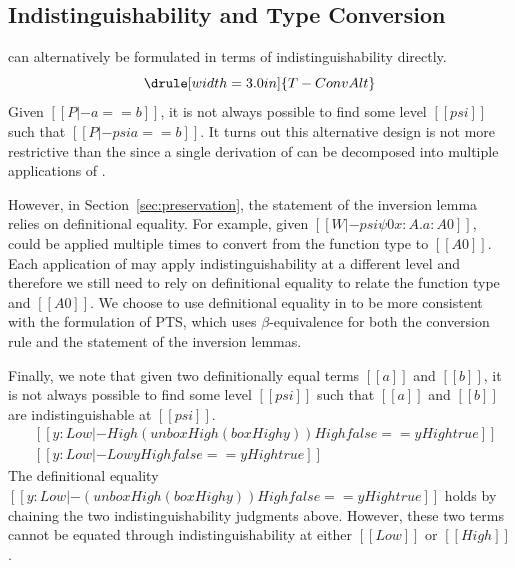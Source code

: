 \documentclass[acmsmall]{acmart}
\newcommand{\scw}[1]{}
\newcommand{\yl}[1]{}
\begin{document}
\ifextended
\subsection{Indistinguishability and Type Conversion}
\scw{Because this alternative does not actually change the language, if we are short 
on space, we can skip this section. It's mostly an observation that we want definitional 
equality to be transitive.}
 can alternatively be
formulated in terms of indistinguishability directly.
\[\drule[width=3.0in]{T-ConvAlt}\]
Given $[[P |- a == b]]$, it is not always possible to find some level
$[[psi]]$ such that $[[P |- psi a == b]]$. It turns out
this alternative design is not more restrictive than the
 since a single derivation of  can be
decomposed into multiple applications of . 

However, in Section~\ref{sec:preservation}, the statement of the
inversion lemma relies on definitional equality. For example, given 
$[[W |- psi \psi0 x : A . a : A0]]$,  could
be applied multiple times to convert from the function type to
$[[A0]]$. Each application of  may apply
indistinguishability at a different level and therefore we still need
to rely on definitional equality to relate the function type and
$[[A0]]$. We choose to use definitional equality in 
to be more consistent with the formulation of PTS, which uses
$\beta$-equivalence for both the conversion rule and the statement of the
inversion lemmas.

\scw{We could move this example to the explanation of $[[ P |- a == b ]]$. I think it 
helps explain the expressiveness of the relationship.}
\yl{I find the example  too pathological to help explain
  expressiveness. That's why I moved it here from Section 3.}

Finally, we note that given two definitionally equal terms $[[a]]$ and $[[b]]$,
it is not always possible to find some level $[[psi]]$ such that
$[[a]]$ and $[[b]]$ are indistinguishable at $[[psi]]$.
\begin{align*}
&[[y : Low |- High (unbox High (box High y)) High false   == y High true ]]\\
&[[y : Low |- Low y High false == y High true ]]
\end{align*}
The definitional equality  $[[y : Low |- (unbox High (box High y)) High false == y High true]] $
holds by chaining the two indistinguishability judgments above.
However, these two terms cannot be equated through
indistinguishability at either $[[Low]]$ or $[[High]]$.
\end{document}
